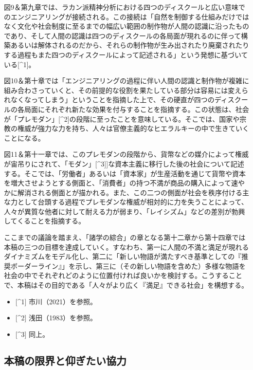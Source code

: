 図9＆第九章では、ラカン派精神分析における四つのディスクールと広い意味でのエンジニアリングが接続される。この接続は「自然を制御する仕組みだけではなく文化や社会制度に至るまでの幅広い範囲の制作物が人間の認識に沿ったものであり、そして人間の認識は四つのディスクールの各局面が現れるのに伴って構築あるいは解体されるのだから、それらの制作物が生み出されたり廃棄されたりする過程もまた四つのディスクールによって記述される」という発想に基づいている{[}\^{}1{]}。

図10＆第十章では「エンジニアリングの過程に伴い人間の認識と制作物が複雑に組み合わさっていくと、その前提的な役割を果たしている部分は容易には変えられなくなってしまう」ということを指摘した上で、その硬直が四つのディスクールの各局面にそれぞれ新たな効果を付与することを指摘する。この状態は、社会が「プレモダン」{[}\^{}2{]}の段階に至ったことを意味している。そこでは、国家や宗教の権威が強力な力を持ち、人々は官僚主義的なヒエラルキーの中で生きていくことになる。

図11＆第十一章では、このプレモダンの段階から、貨幣などの媒介によって権威が宙吊りにされて、「モダン」{[}\^{}3{]}{]}な資本主義に移行した後の社会について記述する。そこでは、「労働者」あるいは「資本家」が生産活動を通じて貨幣や資本を増大させようとする側面と、「消費者」の持つ不満が商品の購入によって速やかに解消される側面とが描かれる。また、この二つの側面が社会を秩序付ける主な力として台頭する過程でプレモダンな権威が相対的に力を失うことによって、人々が異質な他者に対して耐える力が弱まり、「レイシズム」などの差別が勃興してくることを指摘する。

ここまでの議論を踏まえ、「諸学の綜合」の章となる第十二章から第十四章では本稿の三つの目標を達成していく。すなわち、第一に人間の不満と満足が現れるダイナミズムをモデル化し、第二に「新しい物語が満たすべき基準としての『推奨ボーダーライン』」を示し、第三に（その新しい物語を含めた）多様な物語を社会の中でそれぞれどのように位置付ければ良いかを検討する。こうすることで、本稿はその目的である「人々がより広く『満足』できる社会」を構想する。

\begin{itemize}
\tightlist
\item
  {[}\^{}1{]} 市川（2021）を参照。
\item
  {[}\^{}2{]} 浅田（1983）を参照。
\item
  {[}\^{}3{]} 同上。
\end{itemize}

\subsection{本稿の限界と仰ぎたい協力}\label{ux672cux7a3fux306eux9650ux754cux3068ux4ef0ux304eux305fux3044ux5354ux529b}

